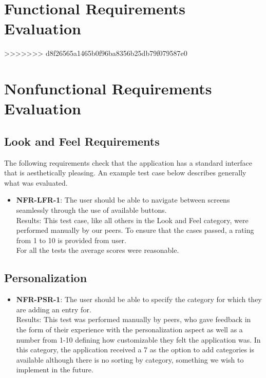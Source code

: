 \documentclass[12pt, titlepage]{article}
\begin{document}
\section{Functional Requirements Evaluation}

>>>>>>> d8f26565a1465b0f96ba8356b25db79f079587e0
\section{Nonfunctional Requirements Evaluation}

	\subsection{Look and Feel Requirements}		
		The following requirements check that the application has a standard interface that is aesthetically pleasing. An example test case below describes generally what was evaluated.

		\begin{itemize}
		
			\item \textbf{NFR-LFR-1}: The user should be able to navigate between screens seamlessly through the use of available buttons. \\
			Results: This test case, like all others in the Look and Feel category, were performed manually by our peers. To ensure that the cases passed, a rating from 1 to 10 is provided from user.\\
			For all the tests the average scores were reasonable. 

		\end{itemize}

	\subsection{Personalization}

		\begin{itemize}

			\item \textbf{NFR-PSR-1}: The user should be able to specify the category for which they are adding an entry for. \\
			Results: This test was performed manually by peers, who gave feedback in the form of their experience with the personalization aspect as well as a number from 1-10 defining how customizable they felt the application was. In this category, the application received a 7 as the option to add categories is available although there is no sorting by category, something we wish to implement in the future.


		\end{itemize}
\end{document}
